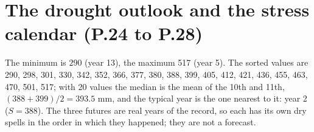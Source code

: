 \section{The drought outlook and the stress calendar (P.24 to P.28)}
\sol  The minimum is $290$ (year 13), the maximum 517 (year 5). The sorted values are 290, 298, 301, 330, 342, 352, 366, 377, 380, 388, 399, 405, 412, 421, 436, 455, 463, 470, 501, 517; with 20 values the median is the mean of the 10th and 11th, $(388+399)/2=393.5$ mm, and the typical year is the one nearest to it: year 2 ($S=388$). The three futures are real years of the record, so each has its own dry spells in the order in which they happened; they are not a forecast. \finans


